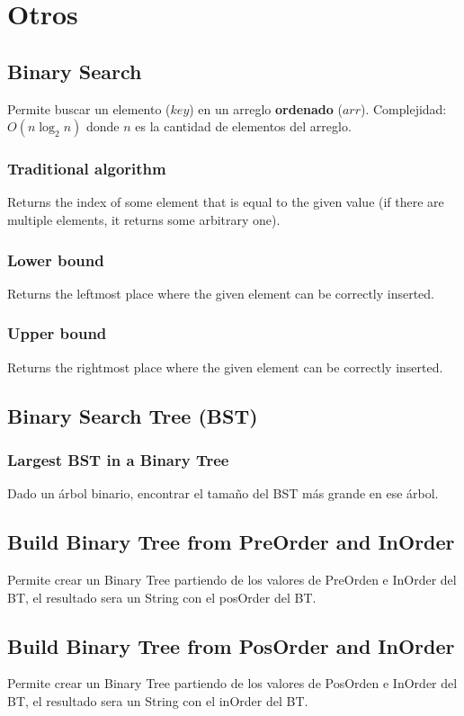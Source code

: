 \documentclass[10pt,letterpaper]{article}
\newcommand{\source}[1]{
  
  \dotfill
}
\begin{document}
\section{Otros}
  \subsection{Binary Search}
    Permite buscar un elemento ($key$) en un arreglo \textbf{ordenado} ($arr$).
    Complejidad: $O(n \log_2 n)$ donde $n$ es la cantidad de elementos del arreglo.\\
    \source{./src/binarySearch.cpp}
    \subsubsection{Traditional algorithm}
      Returns the index of some element that is equal to the given value (if there are multiple
      elements, it returns some arbitrary one).
      \source{./src/binary_search.cpp}
    \subsubsection{Lower bound}
      Returns the leftmost place where the given element can be correctly inserted.
      \source{./src/lower_bound.cpp}
    \subsubsection{Upper bound}
      Returns the rightmost place where the given element can be correctly inserted.
      \source{./src/upper_bound.cpp}
  \subsection{Binary Search Tree (BST)}
    \subsubsection{Largest BST in a Binary Tree}
      Dado un árbol binario, encontrar el tamaño del BST más grande en ese árbol.
      \source{./src/largest_bst.java}
  \subsection{Build Binary Tree from PreOrder and InOrder}
    Permite crear un Binary Tree partiendo de los valores de PreOrden e InOrder del BT, el resultado sera un String con el posOrder del BT.
    \source{./src/build-BT-from-pre-in.cpp}
   \subsection{Build Binary Tree from PosOrder and InOrder}
    Permite crear un Binary Tree partiendo de los valores de PosOrden e InOrder del BT, el resultado sera un String con el inOrder del BT.
    \source{./src/build-BT-from-pos-in.cpp}
\end{document}
